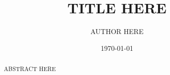 \documentclass{article}
\begin{document}
\title{TITLE HERE}
\author{AUTHOR HERE}
\date{\today}
\maketitle	
	
\begin{abstract}
	ABSTRACT HERE
\end{abstract}	


\printbibliography
\end{document}
